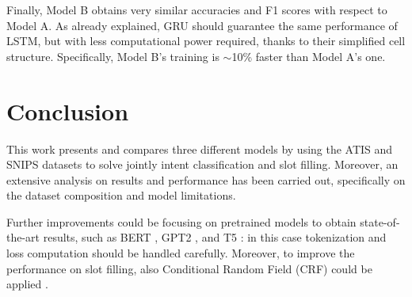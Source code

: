 \documentclass[a4paper]{article}
\begin{document}
Finally, Model B obtains very similar accuracies and F1 scores with respect to Model A. As already explained, GRU should guarantee the same performance of LSTM, but with less computational power required, thanks to their simplified cell structure. Specifically, Model B's training is $\sim$10\% faster than Model A's one.

\section{Conclusion}
This work presents and compares three different models by using the ATIS and SNIPS datasets to solve jointly intent classification and slot filling. Moreover, an extensive analysis on results and performance has been carried out, specifically on the dataset composition and model limitations.

Further improvements could be focusing on pretrained models to obtain state-of-the-art results, such as BERT \cite{DBLP:journals/corr/abs-1810-04805}, GPT2 \cite{Radford2019LanguageMA}, and T5 \cite{DBLP:journals/corr/abs-1910-10683}: in this case tokenization and loss computation should be handled carefully. Moreover, to improve the performance on slot filling, also Conditional Random Field (CRF) could be applied \cite{DBLP:journals/corr/HuangXY15}.



\end{document}
